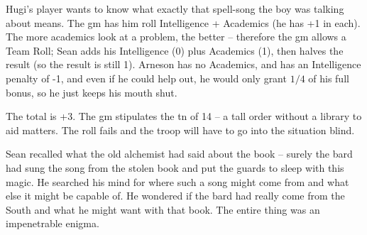 \begin{exampletext}

  Hugi's player wants to know what exactly that spell-song the boy was talking about means.
  The \gls{gm} has him roll Intelligence + Academics (he has +1 in each).
  The more academics look at a problem, the better -- therefore the \gls{gm} allows a Team Roll; Sean adds his Intelligence (0) plus Academics (1), then halves the result (so the result is still 1).
  Arneson has no Academics, and has an Intelligence penalty of -1, and even if he could help out, he would only grant $1/4$ of his full bonus, so he just keeps his mouth shut.

  The total is +3.
  The \gls{gm} stipulates the \gls{tn} of 14 -- a tall order without a library to aid matters.
  The roll fails and the troop will have to go into the situation blind.

  Sean recalled what the old alchemist had said about the book -- surely the bard had sung the song from the stolen book and put the guards to sleep with this magic.
  He searched his mind for where such a song might come from and what else it might be capable of.
  He wondered if the bard had really come from the South and what he might want with that book.
  The entire thing was an impenetrable enigma.

\end{exampletext}

